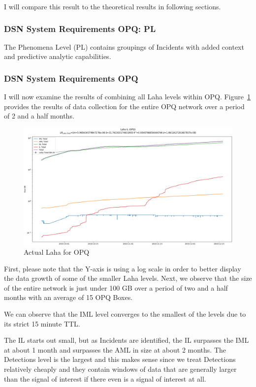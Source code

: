 I will compare this result to the theoretical results in following sections.

\subsubsection{DSN System Requirements OPQ: PL}

The Phenomena Level (PL) contains groupings of Incidents with added context and predictive analytic capabilities.


\subsubsection{DSN System Requirements OPQ}

I will now examine the results of combining all Laha levels within OPQ. Figure~\ref{fig:actual_laha_opq} provides the results of data collection for the entire OPQ network over a period of 2 and a half months.

\begin{figure}[H]
    \centering
    \includegraphics[width=\linewidth]{figures/actual_laha_opq.png}
    \caption{Actual Laha for OPQ}
    \label{fig:actual_laha_opq}
\end{figure}

First, please note that the Y-axis is using a log scale in order to better display the data growth of some of the smaller Laha levels. Next, we observe that the size of the entire network is just under 100 GB over a period of two and a half months with an average of 15 OPQ Boxes.

We can observe that the IML level converges to the smallest of the levels due to its strict 15 minute TTL.

The IL starts out small, but as Incidents are identified, the IL surpasses the IML at about 1 month and surpasses the AML in size at about 2 months. The Detections level is the largest and this makes sense since we treat Detections relatively cheaply and they contain windows of data that are generally larger than the signal of interest if there even is a signal of interest at all.

